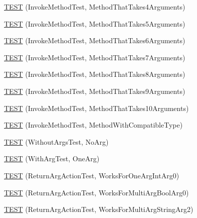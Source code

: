 \begin{DoxyCompactItemize}
\item 
\hyperlink{namespacetesting_1_1gmock__more__actions__test_af0ab6ef9fdf48e8442a5579ab27eb517}{T\+E\+ST} (Invoke\+Method\+Test, Method\+That\+Takes4\+Arguments)
\item 
\hyperlink{namespacetesting_1_1gmock__more__actions__test_a512db122c5beadeeef026bb54aec7e45}{T\+E\+ST} (Invoke\+Method\+Test, Method\+That\+Takes5\+Arguments)
\item 
\hyperlink{namespacetesting_1_1gmock__more__actions__test_a715c088109e141aa577e497e3729b98b}{T\+E\+ST} (Invoke\+Method\+Test, Method\+That\+Takes6\+Arguments)
\item 
\hyperlink{namespacetesting_1_1gmock__more__actions__test_a1f11171c55d049143c980502213e0b11}{T\+E\+ST} (Invoke\+Method\+Test, Method\+That\+Takes7\+Arguments)
\item 
\hyperlink{namespacetesting_1_1gmock__more__actions__test_a5bfedd2255bbfe7ffcbc76ec581b2ff6}{T\+E\+ST} (Invoke\+Method\+Test, Method\+That\+Takes8\+Arguments)
\item 
\hyperlink{namespacetesting_1_1gmock__more__actions__test_acdcc7f6a35e6373f3d0b3a71f98c418b}{T\+E\+ST} (Invoke\+Method\+Test, Method\+That\+Takes9\+Arguments)
\item 
\hyperlink{namespacetesting_1_1gmock__more__actions__test_a14b55eb4c0d0b3149e269eea1443cb58}{T\+E\+ST} (Invoke\+Method\+Test, Method\+That\+Takes10\+Arguments)
\item 
\hyperlink{namespacetesting_1_1gmock__more__actions__test_adb0c29d688c079ad5bf07d5a0bd72aea}{T\+E\+ST} (Invoke\+Method\+Test, Method\+With\+Compatible\+Type)
\item 
\hyperlink{namespacetesting_1_1gmock__more__actions__test_a68748f21021e787dfdc095691c94d495}{T\+E\+ST} (Without\+Args\+Test, No\+Arg)
\item 
\hyperlink{namespacetesting_1_1gmock__more__actions__test_a40664c1acdc3650e8edf9a9a49b008de}{T\+E\+ST} (With\+Arg\+Test, One\+Arg)
\item 
\hyperlink{namespacetesting_1_1gmock__more__actions__test_a717ea38d7b78b6d51b4d617ed317d26e}{T\+E\+ST} (Return\+Arg\+Action\+Test, Works\+For\+One\+Arg\+Int\+Arg0)
\item 
\hyperlink{namespacetesting_1_1gmock__more__actions__test_a0705d7e6083d129caae9d91cc5d6d570}{T\+E\+ST} (Return\+Arg\+Action\+Test, Works\+For\+Multi\+Arg\+Bool\+Arg0)
\item 
\hyperlink{namespacetesting_1_1gmock__more__actions__test_ae280b3b95b0cdfcf7b81de95c8fe942d}{T\+E\+ST} (Return\+Arg\+Action\+Test, Works\+For\+Multi\+Arg\+String\+Arg2)

\end{DoxyCompactItemize}
